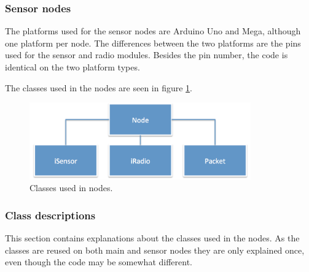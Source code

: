 \subsubsection*{Sensor nodes}
The platforms used for the sensor nodes are Arduino Uno and Mega, although one platform per node. The differences between the two platforms are the pins used for the sensor and radio modules. Besides the pin number, the code is identical on the two platform types. 

The classes used in the nodes are seen in figure \ref{fig:nodeClass}.
\begin{figure}[h!]
\centering
\includegraphics[width=0.85\textwidth]{chapters/implementation/figures/nodeClass.png}
\caption{Classes used in nodes.}
\label{fig:nodeClass}
\end{figure}


\subsubsection*{Class descriptions}
This section contains explanations about the classes used in the nodes. As the classes are reused on both main and sensor nodes they are only explained once, even though the code may be somewhat different.

